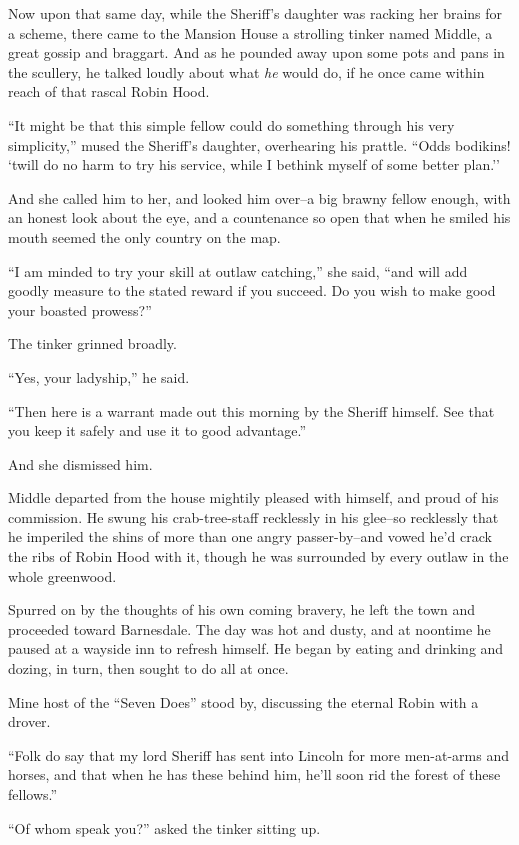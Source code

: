 Now upon that same day, while the Sheriff's daughter was racking her
brains for a scheme, there came to the Mansion House a strolling tinker
named Middle, a great gossip and braggart. And as he pounded away upon
some pots and pans in the scullery, he talked loudly about what
\emph{he} would do, if he once came within reach of that rascal Robin
Hood.

``It might be that this simple fellow could do something through his
very simplicity,'' mused the Sheriff's daughter, overhearing his
prattle. ``Odds bodikins! `twill do no harm to try his service, while I
bethink myself of some better plan.''

And she called him to her, and looked him over--a big brawny fellow
enough, with an honest look about the eye, and a countenance so open
that when he smiled his mouth seemed the only country on the map.

``I am minded to try your skill at outlaw catching,'' she said, ``and
will add goodly measure to the stated reward if you succeed. Do you wish
to make good your boasted prowess?''

The tinker grinned broadly.

``Yes, your ladyship,'' he said.

``Then here is a warrant made out this morning by the Sheriff himself.
See that you keep it safely and use it to good advantage.''

And she dismissed him.

Middle departed from the house mightily pleased with himself, and proud
of his commission. He swung his crab-tree-staff recklessly in his
glee--so recklessly that he imperiled the shins of more than one angry
passer-by--and vowed he'd crack the ribs of Robin Hood with it, though
he was surrounded by every outlaw in the whole greenwood.

Spurred on by the thoughts of his own coming bravery, he left the town
and proceeded toward Barnesdale. The day was hot and dusty, and at
noontime he paused at a wayside inn to refresh himself. He began by
eating and drinking and dozing, in turn, then sought to do all at once.

Mine host of the ``Seven Does'' stood by, discussing the eternal Robin
with a drover.

``Folk do say that my lord Sheriff has sent into Lincoln for more
men-at-arms and horses, and that when he has these behind him, he'll
soon rid the forest of these fellows.''

``Of whom speak you?'' asked the tinker sitting up.

